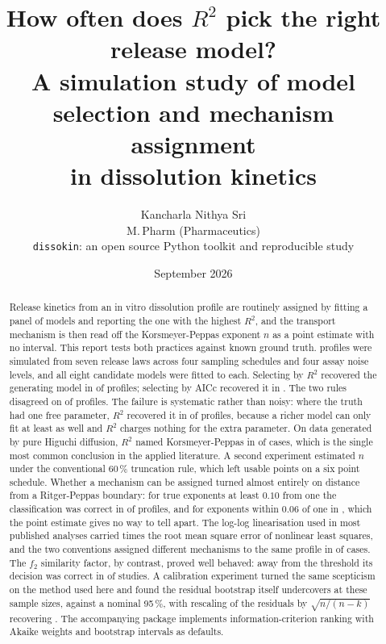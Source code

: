 \documentclass[11pt,a4paper]{article}
\title{\bfseries How often does $R^2$ pick the right release model?\\[0.25em]
\large A simulation study of model selection and mechanism assignment\\
in dissolution kinetics}
\author{Kancharla Nithya Sri\\[0.2em]
\small M.\,Pharm (Pharmaceutics)\\
\small \texttt{dissokin}: an open source Python toolkit and reproducible study}
\date{September 2026}
\begin{document}
\maketitle

\begin{abstract}
\noindent
Release kinetics from an in vitro dissolution profile are routinely assigned
by fitting a panel of models and reporting the one with the highest $R^2$, and
the transport mechanism is then read off the Korsmeyer-Peppas exponent $n$
as a point estimate with no interval. This report tests both practices
against known ground truth. \selNprof{} profiles were simulated from seven
release laws across four sampling schedules and four assay noise levels, and
all eight candidate models were fitted to each. Selecting by $R^2$ recovered
the generating model in \RecRtwo{} of profiles; selecting by AICc recovered it
in \RecAICc{}. The two rules disagreed on \Disagree{} of profiles. The failure
is systematic rather than noisy: where the truth had one free parameter, $R^2$
recovered it in \RecRtwoOnePar{} of \NOnePar{} profiles, because a richer
model can only fit at least as well and $R^2$ charges nothing for the extra
parameter. On data generated by pure Higuchi
diffusion, $R^2$ named Korsmeyer-Peppas in \HigPickRtwoF{} of cases, which is
the single most common conclusion in the applied literature. A second
experiment estimated $n$ under the conventional 60\,\% truncation rule, which
left \KeptSix{} usable points on a six point schedule. Whether a mechanism can
be assigned turned almost entirely on distance from a Ritger-Peppas boundary:
for true exponents at least $0.10$ from one the classification was correct in
\ClassCorrectInterior{} of profiles, and for exponents within $0.06$ of one in
\ClassCorrectBoundary{}, which the point estimate gives no way to tell apart.
The log-log linearisation used in most published analyses carried
\RmseRatio{} times the root mean square error of nonlinear least squares, and
the two conventions assigned different mechanisms to the same profile in
\Disagreeance{} of cases. The $f_2$ similarity factor, by contrast, proved
well behaved: away from the threshold its decision was correct in \fFarAcc{}
of studies. A calibration experiment turned the same scepticism on the method used
here and found the residual bootstrap itself undercovers at these sample
sizes, \CovPlain{} against a nominal 95\,\%, with rescaling of the residuals
by $\sqrt{n/(n-k)}$ recovering \CovResc{}. The
accompanying package implements information-criterion ranking with Akaike
weights and bootstrap intervals as defaults.
\end{abstract}
\end{document}
